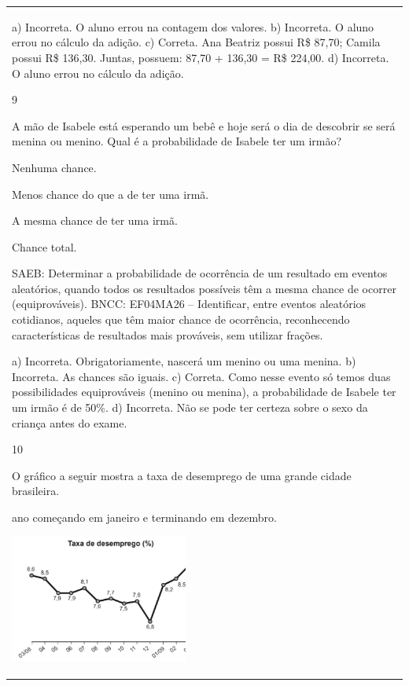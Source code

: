 \begin{mdframed}[linewidth=2pt,linecolor=salmao,roundcorner=2pt]
\begin{escolha}
{{{\begin{longtable}[]{@{}l@{}}
\begin{itemize}
{a) Incorreta. O aluno errou na contagem dos valores.
b) Incorreta. O aluno errou no cálculo da adição.
c) Correta. Ana Beatriz possui R\$ 87,70; Camila possui R\$ 136,30. Juntas, possuem: 87,70 + 136,30 = R\$ 224,00.
d) Incorreta. O aluno errou no cálculo da adição.

\num{9}

A mão de Isabele está esperando um bebê e hoje será o dia de descobrir
se será menina ou menino. Qual é a probabilidade de Isabele ter um irmão?

\begin{escolha}
\item
  Nenhuma chance.
\item
  Menos chance do que a de ter uma irmã.
\item
  A mesma chance de ter uma irmã.
\item
  Chance total.
\end{escolha}

SAEB: Determinar a probabilidade de ocorrência de um
resultado em eventos aleatórios, quando todos os resultados possíveis
têm a mesma chance de ocorrer (equiprováveis).
BNCC: EF04MA26 -- Identificar, entre eventos aleatórios cotidianos, aqueles que têm maior chance de
ocorrência, reconhecendo características de resultados mais prováveis, sem utilizar frações.

a) Incorreta. Obrigatoriamente, nascerá um menino ou uma menina.
b) Incorreta. As chances são iguais.
c) Correta. Como nesse evento só temos duas possibilidades equiprováveis (menino ou
menina), a probabilidade de Isabele ter um irmão é de 50\%.
d) Incorreta. Não se pode ter certeza sobre o sexo da criança antes do exame.

\num{10}

O gráfico a seguir mostra a taxa de desemprego de uma grande cidade
brasileira.


ano começando em janeiro e terminando em dezembro.

\includegraphics[width=2.29697in,height=1.66026in]{media/image146.png}

}
\end{itemize}
\end{longtable}}}}
\end{escolha}
\end{mdframed}
